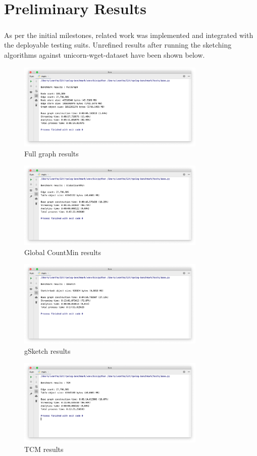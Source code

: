 \chapter{Preliminary Results}

\paragraph{}
As per the initial milestones, related work was implemented and integrated with the deployable testing suits. Unrefined results after running the sketching algorithms against unicorn-wget-dataset have been shown below. 

\begin{figure}[H]
    \centering
    \includegraphics[width=0.8\textwidth]{images/fgraph-results}
    \caption{Full graph results}
\end{figure}

\begin{figure}[H]
    \centering
    \includegraphics[width=0.8\textwidth]{images/gcm-results}
    \caption{Global CountMin results}
\end{figure}

\begin{figure}[H]
    \centering
    \includegraphics[width=0.8\textwidth]{images/gsketch-results}
    \caption{gSketch results}
\end{figure}

\begin{figure}[H]
    \centering
    \includegraphics[width=0.8\textwidth]{images/tcm-results}
    \caption{TCM results}
\end{figure}